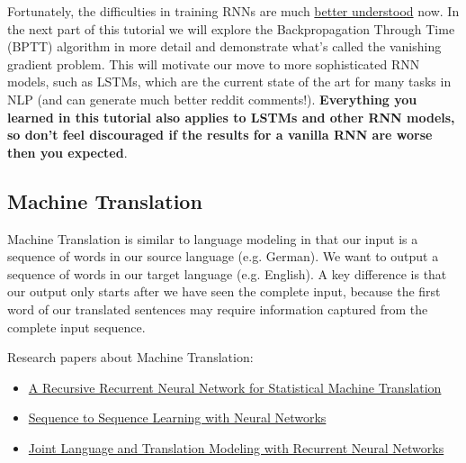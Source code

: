 Fortunately, the difficulties in training RNNs are much \href{http://arxiv.org/abs/1211.5063}{better understood} now. In the next part of this tutorial we will explore the Backpropagation Through Time (BPTT) algorithm in more detail and demonstrate what's called the vanishing gradient problem. This will motivate our move to more sophisticated RNN models, such as LSTMs, which are the current state of the art for many tasks in NLP (and can generate much better reddit comments!). \textbf{Everything you learned in this tutorial also applies to LSTMs and other RNN models, so don't feel discouraged if the results for a vanilla RNN are worse then you expected}.


\subsection{Machine Translation}
Machine Translation is similar to language modeling in that our input is a sequence of words in our source language (e.g. German). We want to output a sequence of words in our target language (e.g. English). A key difference is that our output only starts after we have seen the complete input, because the first word of our translated sentences may require information captured from the complete input sequence.



Research papers about Machine Translation:
\begin{itemize}
\item \href{http://www.aclweb.org/anthology/P14-1140.pdf}{A Recursive Recurrent Neural Network for Statistical Machine Translation}
\item \href{http://papers.nips.cc/paper/5346-sequence-to-sequence-learning-with-neural-networks.pdf}{Sequence to Sequence Learning with Neural Networks}
\item \href{http://research.microsoft.com/en-us/um/people/gzweig/Pubs/EMNLP2013RNNMT.pdf}{Joint Language and Translation Modeling with Recurrent Neural Networks}
\end{itemize}

